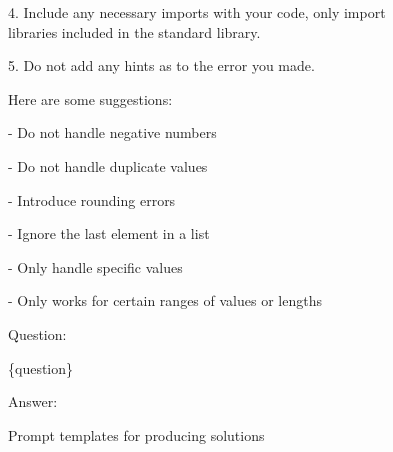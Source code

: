 \begin{figure*}[h]
\begin{tcolorbox}[title={Producing Partially Correct Solutions Prompt}, colback=blue!0, left=2pt,right=2pt,top=2pt,bottom=2pt]
{      4. Include any necessary imports with your code, only import libraries included in the standard library.
      
      5. Do not add any hints as to the error you made.

\vspace{0.3cm}

      Here are some suggestions:
      
      - Do not handle negative numbers
      
      - Do not handle duplicate values
      
      - Introduce rounding errors

      - Ignore the last element in a list
      
      - Only handle specific values
      
      - Only works for certain ranges of values or lengths

\vspace{0.3cm}

      Question:

      \{question\}
\vspace{0.3cm}

      Answer:
  }
  \end{tcolorbox}

  \caption{Prompt templates for producing solutions}
  \label{fig:generate_samples_prompt}

\end{figure*}
